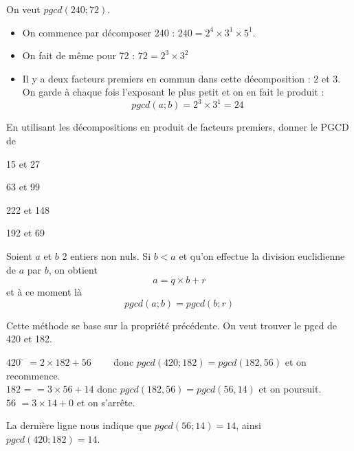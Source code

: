 \begin{exemple}[]
	On veut $pgcd(240;72)$.
	\begin{itemize}
		\item 	On commence par décomposer 240 : $240=2^4\times 3^1\times 5^1$.
		\item 	On fait de même pour 72 : $72 = 2^3\times3^2$
		\item 	Il y a deux facteurs premiers en commun dans cette décomposition : 2 et 3. On garde à chaque fois l'exposant le plus petit et on en fait le produit : $$pgcd(a;b)=2^3\times 3^1=24$$
	\end{itemize}
\end{exemple}


\begin{exercice}
	En utilisant les décompositions en produit de facteurs premiers, donner le \textsc{PGCD} de
	
	\begin{multicols}{2}
		\begin{enumalph}
			\item 15 et 27
			\item 63 et 99
			\item 222 et 148
			\item 192 et 69
		\end{enumalph}
	\end{multicols}
\end{exercice}


\begin{propriete}[]
	Soient $a$ et $b$ 2 entiers non nuls. Si $b<a$ et qu'on effectue la division euclidienne de $a$ par $b$, on obtient $$a = q\times b +r$$ et à ce moment là
	$$pgcd(a;b)=pgcd(b;r)$$
\end{propriete}
\begin{methode}
	Cette méthode se base sur la propriété précédente. On veut trouver le pgcd de 420 et 182.
	\begin{tabbing}
		$420$ 	\= $=2\times 182+56\qquad$ \= donc $pgcd(420;182)=pgcd(182,56)$ et on recommence.\\
		$182$	\>= $=3\times 56+14$ \>  donc $pgcd(182,56)=pgcd(56,14)$ et on poursuit.\\
		$56$	\> $=3\times 14+\boxed{0}$ \> et on s'arrête.
	\end{tabbing}
	La dernière ligne nous indique que $pgcd(56;14)=14$, ainsi $pgcd(420;182)=14$.
\end{methode}


